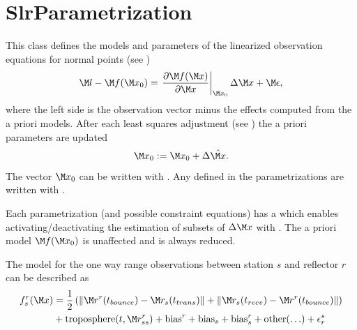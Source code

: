 \section{SlrParametrization}\label{slrParametrizationType}
This class defines the models and parameters of the linearized observation equations
for normal points (see )
\begin{equation}\label{slrParametrizationType:model}
  \M l - \M f(\M x_0) = \left.\frac{\partial \M f(\M x)}{\partial \M x}\right|_{\M x_0} \Delta\M x + \M\epsilon,
\end{equation}
where the left side is the observation vector minus the effects computed from the a priori models.
After each least squares adjustment
(see )
the a priori parameters are updated
\begin{equation}\label{slrParametrizationType:update}
  \M x_0 := \M x_0 + \Delta\hat{\M x}.
\end{equation}
The vector $\M x_0$ can be written with
.
Any  defined in the parametrizations are written with
.

Each parametrization (and possible constraint equations) has a  which enables
activating/deactivating the estimation of subsets of $\Delta\M x$ with
.
The a priori model $\M f(\M x_0)$ is unaffected and is always reduced.

The model for the one way range observations between station $s$ and reflector $r$
can be described as
\begin{equation}\label{slrParametrizationType:slrFullModel}
\begin{split}
  f_s^r(\M x) &= \frac{1}{2}\left(\left\lVert \M r^r(t_{bounce})-\M r_s(t_{trans}) \right\rVert
                          + \left\lVert \M r_s(t_{recv})-\M r^r(t_{bounce}) \right\rVert\right)  \\
              &+ \text{troposphere}(t,\M r_{ss}^r)
               + \text{bias}^r + \text{bias}_s + \text{bias}_s^r + \text{other}(\ldots) + \epsilon_r^s
\end{split}
\end{equation}


